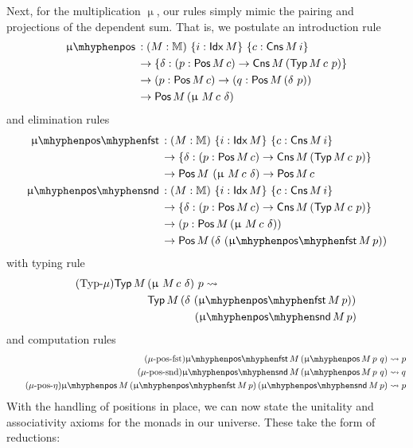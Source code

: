 Next, for the multiplication $\upmu$, our rules simply mimic the
pairing and projections of the dependent sum.  That is, we
postulate an introduction rule
\begin{align*}
  \mupos &: (M : \MM)\ \{i : \Idx M\}\ \{c : \Cns M\, i\}\ \\
          &\to \{\delta : (p : \Pos M\, c) \to \Cns M\, (\Typ M\, c\ p)\}\\ 
          &\to (p : \Pos M\, c) \to (q : \Pos M\, (\delta\ p))\\
         &\to \Pos M\, (\upmu\ M\, c\ \delta)
\end{align*}
and elimination rules
\begin{align*}
  \muposfst &: (M : \MM)\ \{i : \Idx M\}\ \{c : \Cns M\, i\}\\
            &\to \{\delta : (p : \Pos M\, c) \to \Cns M\, (\Typ M\, c\ p)\}\\
            &\to \Pos M\ (\upmu\ M\, c\ \delta) \to \Pos M\, c\\
  \mupossnd &: (M : \MM)\ \{i : \Idx M\}\ \{c : \Cns M\, i\}\\
            &\to \{\delta : (p : \Pos M\, c) \to \Cns M\, (\Typ M\, c\ p)\}\\
            &\to (p : \Pos M\, (\upmu\ M\, c\ \delta))\\
            &\to \Pos M\, (\delta\ (\muposfst M\, p))
\end{align*}
with typing rule
\begin{align*}
  \label{rewrite:muTyp}
  \tag{Typ-$\mu$}
  \Typ M\, &(\upmu\ M\, c\ \delta)\ p \leadsto \\
           &\Typ M\, (\delta\ (\muposfst M\, p))\ \\
           &\hspace{1.5cm} (\mupossnd M\, p)
\end{align*}
and computation rules
\begin{align*}
  \label{rewrite:muposfst}
  \tag{$\mu$-pos-fst}
  \muposfst M\, (\mupos M\, p\ q) &\leadsto p\\
  \label{rewrite:mupossnd}
  \tag{$\mu$-pos-snd}
  \mupossnd M\, (\mupos M\, p\ q) &\leadsto q\\
  \label{rewrite:muposeta}
  \tag{$\mu$-pos-$\eta$}
  \mupos M\, (\muposfst M\, p)\, (\mupossnd M\, p) &\leadsto p \\
\end{align*}
With the handling of positions in place, we can now state the
unitality and associativity axioms for the monads in our universe.
These take the form of reductions:
